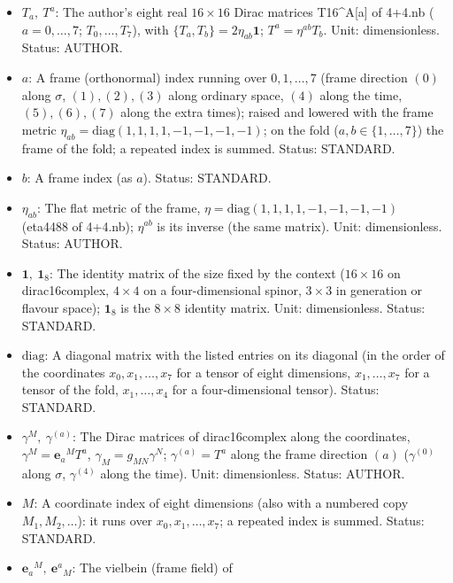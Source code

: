 \documentclass[
  10pt,
]{article}
\providecommand{\tightlist}{%
  \setlength{\itemsep}{0pt}\setlength{\parskip}{0pt}}
\begin{document}
\begin{itemize}
\tightlist
\item
  \(T_a,\ T^a\): The author's eight real \(16 \times 16\) Dirac matrices
  T16\^{}A{[}a{]} of 4+4.nb (\(a = 0, \dots, 7\); \(T_0, \dots, T_7\)),
  with \(\{T_a, T_b\} = 2\eta_{ab}\mathbf{1}\); \(T^a = \eta^{ab}T_b\).
  Unit: dimensionless. Status: AUTHOR.
\item
  \(a\): A frame (orthonormal) index running over \(0, 1, \dots, 7\)
  (frame direction \((0)\) along \(\sigma\), \((1), (2), (3)\) along
  ordinary space, \((4)\) along the time, \((5), (6), (7)\) along the
  extra times); raised and lowered with the frame metric
  \(\eta_{ab} = \mathrm{diag}(1, 1, 1, 1, -1, -1, -1, -1)\); on the fold
  (\(a, b \in \{1, \dots, 7\}\)) the frame of the fold; a repeated index
  is summed. Status: STANDARD.
\item
  \(b\): A frame index (as \(a\)). Status: STANDARD.
\item
  \(\eta_{ab}\): The flat metric of the frame,
  \(\eta = \mathrm{diag}(1, 1, 1, 1, -1, -1, -1, -1)\) (eta4488 of
  4+4.nb); \(\eta^{ab}\) is its inverse (the same matrix). Unit:
  dimensionless. Status: AUTHOR.
\item
  \(\mathbf{1},\ \mathbf{1}_8\): The identity matrix of the size fixed
  by the context (\(16 \times 16\) on dirac16complex, \(4 \times 4\) on
  a four-dimensional spinor, \(3 \times 3\) in generation or flavour
  space); \(\mathbf{1}_8\) is the \(8 \times 8\) identity matrix. Unit:
  dimensionless. Status: STANDARD.
\item
  \(\mathrm{diag}\): A diagonal matrix with the listed entries on its
  diagonal (in the order of the coordinates \(x_0, x_1, \dots, x_7\) for
  a tensor of eight dimensions, \(x_1, \dots, x_7\) for a tensor of the
  fold, \(x_1, \dots, x_4\) for a four-dimensional tensor). Status:
  STANDARD.
\item
  \(\gamma^M,\ \gamma^{(a)}\): The Dirac matrices of dirac16complex
  along the coordinates, \(\gamma^M = \mathbf{e}_a{}^MT^a\),
  \(\gamma_M = g_{MN}\gamma^N\); \(\gamma^{(a)} = T^a\) along the frame
  direction \((a)\) (\(\gamma^{(0)}\) along \(\sigma\), \(\gamma^{(4)}\)
  along the time). Unit: dimensionless. Status: AUTHOR.
\item
  \(M\): A coordinate index of eight dimensions (also with a numbered
  copy \(M_1, M_2, \dots\)): it runs over \(x_0, x_1, \dots, x_7\); a
  repeated index is summed. Status: STANDARD.
\item
  \(\mathbf{e}_a{}^M,\ \mathbf{e}^a{}_M\): The vielbein (frame field) of

\end{itemize}
\end{document}
